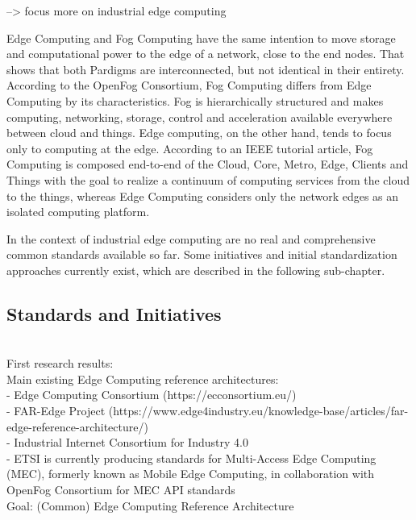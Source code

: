  --> focus more on industrial edge computing 

Edge Computing and Fog Computing have the same intention to move storage and computational power to the edge of a network, close to the end nodes. That shows that both Pardigms are interconnected, but not identical in their entirety.
According to the OpenFog Consortium, Fog Computing differs from Edge Computing by its characteristics. Fog is hierarchically structured and makes computing, networking, storage, control and acceleration available everywhere between cloud and things.
Edge computing, on the other hand, tends to focus only to computing at the edge. According to an IEEE tutorial article, Fog Computing is composed end-to-end of the Cloud, Core, Metro, Edge, Clients and Things with the goal to realize a continuum of computing services from the cloud to the things, whereas Edge Computing considers only the network edges as an isolated computing platform.  

In the context of industrial edge computing are no real and comprehensive common standards available so far. Some initiatives and initial standardization approaches currently exist, which are described in the following sub-chapter. 

\subsection{Standards and Initiatives}
\\
First research results:\\
Main existing Edge Computing reference architectures:\\
- Edge Computing Consortium (https://ecconsortium.eu/)\\ 
- FAR-Edge Project (https://www.edge4industry.eu/knowledge-base/articles/far-edge-reference-architecture/)\\
- Industrial Internet Consortium for Industry 4.0\\
- ETSI is currently producing standards for Multi-Access Edge Computing (MEC), formerly known as Mobile Edge Computing, in collaboration with OpenFog Consortium for MEC API standards\\

Goal: (Common) Edge Computing Reference Architecture